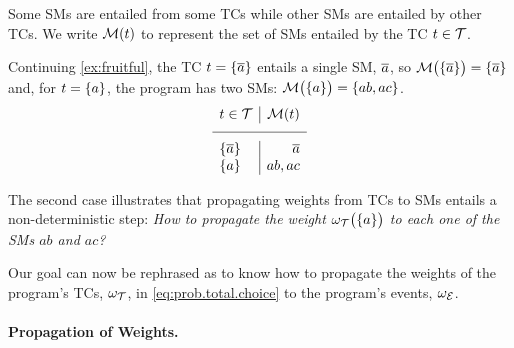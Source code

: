 \documentclass[x11names]{tlp}
\renewcommand{\cite}{\citep}
\begin{document}
\fi Some \aclp{SM} are entailed from some \aclp{TC} while other \acp{SM} are entailed by other \acp{TC}.
We write $\tcgen{t}$ to represent the set of \aclp{SM} entailed by the \acl{TC} $t \in \TCHOICEset$.

\ifExamples
	\begin{example}%
		\em

		Continuing \cref{ex:fruitful}, the \acl{TC} $t = \set{\ensuremath{\overline{a}}}$ entails a
		single \acl{SM}, $\overline{a}$, so $ \MODELset\at{\set{\co{a}}} = \set{\co{a}} $
		and, for $t = \set{a}$, the program has two \aclp{SM}: $
			\MODELset\at{\set{a}} = \set{ab, ac}$.
		\begin{equation*}
			\begin{array}{l|r}
				t \in \TCHOICEset   & \MODELset\at{t} %
				\\
				\hline \set{\co{a}} & \co{a}          %
				\\
				\set{a}             & ab, ac
			\end{array}
		\end{equation*}

		The second case illustrates that propagating weights from \aclp{TC} to
		\aclp{SM} entails a non-deterministic step: \textit{How to propagate the
			weight $\wgtT\at{\set{a}}$ to each one of the \aclp{SM} $ab$ and $ac$?}
	\end{example}
\fi

Our goal can now be rephrased as to know how to propagate the weights of the program's \aclp{TC}, $\wgtT$, in \cref{eq:prob.total.choice}
to the program's events, $\wgtE$.



\paragraph{Propagation of Weights.}
\end{document}
